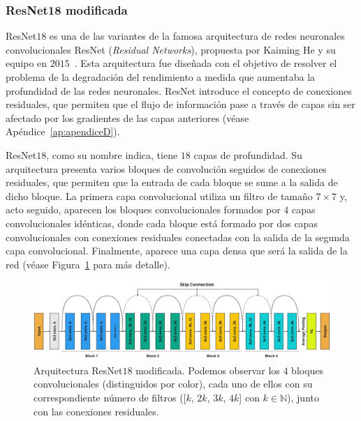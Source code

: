 \subsubsection{ResNet18 modificada}\label{subsubsec:resnet18-modificada}

ResNet$18$ es una de las variantes de la famosa arquitectura de redes neuronales convolucionales ResNet (\textit{Residual Networks}), propuesta por Kaiming He y su equipo en $2015$~\cite{He2015}. Esta arquitectura fue diseñada con el objetivo de resolver el problema de la degradación del rendimiento a medida que aumentaba la profundidad de las redes neuronales. ResNet introduce el concepto de conexiones residuales, que permiten que el flujo de información pase a través de capas sin ser afectado por los gradientes de las capas anteriores (véase Apéndice~\ref{ap:apendiceD}).

ResNet$18$, como su nombre indica, tiene $18$ capas de profundidad. Su arquitectura presenta varios bloques de convolución seguidos de conexiones residuales, que permiten que la entrada de cada bloque se sume a la salida de dicho bloque. La primera capa convolucional utiliza un filtro de tamaño $7 \times 7$ y, acto seguido, aparecen los bloques convolucionales formados por $4$ capas convolucionales idénticas, donde cada bloque está formado por dos capas convolucionales con conexiones residuales conectadas con la salida de la segunda capa convolucional. Finalmente, aparece una capa densa que será la salida de la red (véase Figura~\ref{fig:resnet18} para más detalle).

\begin{figure}[h]
    \centering
    \includegraphics[width=\linewidth]{img/experiments/resnet18modified.png}
    \caption[Arquitectura ResNet$18$ modificada.]{Arquitectura ResNet$18$ modificada. Podemos observar los $4$ bloques convolucionales (distinguidos por color), cada uno de ellos con su correspondiente número de filtros ([$k$, $2k$, $3k$, $4k$] con $k \in \mathbb{N}$), junto con las conexiones residuales.}\label{fig:resnet18}
\end{figure}


